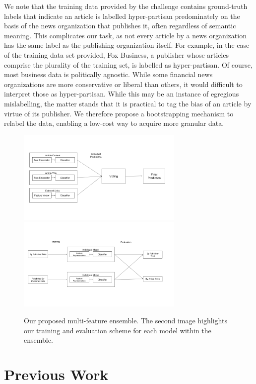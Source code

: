 \documentclass[11pt,a4paper]{article}
\begin{document}
We note that the training data provided by the challenge contains ground-truth labels that indicate an article is labelled hyper-partisan predominately on the basis of the news organization that publishes it, often regardless of semantic meaning. This complicates our task, as not every article by a news organization has the same label as the publishing organization itself. For example, in the case of the training data set provided, Fox Business, a publisher whose articles comprise the plurality of the training set, is labelled as hyper-partisan. Of course, most business data is politically agnostic. While some financial news organizations are more conservative or liberal than others, it would difficult to interpret those as hyper-partisan. While this may be an instance of egregious mislabelling, the matter stands that it is practical to tag the bias of an article by virtue of its publisher. We therefore propose a bootstrapping mechanism to relabel the data, enabling a low-cost way to acquire more granular data.

\begin{figure}[ht]
\caption{Our proposed multi-feature ensemble. The second image highlights our training and evaluation scheme for each model within the ensemble.}
\includegraphics[width=8cm]{images/model.png}
\includegraphics[width=8cm]{images/data_model.png}

\end{figure}

\section{Previous Work}
\end{document}
